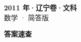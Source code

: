 \documentclass[zihao=-4, a4paper]{ctexart}
\begin{document}
\begin{center}
  {\Large\bfseries 2011 年·辽宁卷·文科}\\[4pt]
  {\large 数学 · 简答版}
\end{center}
\medskip
{}

\clearpage
{}
\begin{center}{\Large\bfseries 答案速查}\end{center}
\medskip

\end{document}
